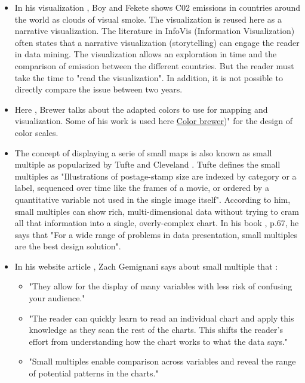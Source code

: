 \documentclass[preprint,journal]{vgtc}       %
\begin{document}
\begin{itemize}[leftmargin=*,parsep=0cm]
\item In his visualization \cite{Boy:2014:TCP}, Boy and Fekete shows C02 emissions in countries around the world as clouds of visual smoke. The visualization is reused here \cite{Mediapart:2014:CPM} as a narrative visualization. The literature in InfoVis (Information Visualization) often states that a narrative visualization (storytelling) can engage the reader in data mining. The visualization allows an exploration in time and the comparison of emission between the different countries. But the reader must take the time to "read the visualization". In addition, it is not possible to directly compare the issue between two years.

\item Here \cite{Brewer:1994:CUG} , Brewer talks about the adapted colors to use for mapping and visualization. Some of his work is used here \href{http://colorbrewer2.org/#type=sequential&scheme=YlGnBu&n=3}{Color brewer})" for the design of color scales.

\item The concept of displaying a serie of small maps is also known as small multiple as popularized by Tufte \cite{Tufte:1983:VDQ} and Cleveland \cite{Cleveland:1985:TEG}. Tufte defines the small multiples as "Illustrations of postage-stamp size are indexed by category or a label, sequenced over time like the frames of a movie, or ordered by a quantitative variable not used in the single image itself". According to him, small multiples can show rich, multi-dimensional data without trying to cram all that information into a single, overly-complex chart. In his book \cite{Tufte:1990:ENI}, p.67, he says that "For a wide range of problems in data presentation, small multiples are the best design solution". 


\item In his website article \cite{Gemignani:2010:BKV}, Zach Gemignani says about small multiple that :
	\begin{itemize}
		\item "They allow for the display of many variables with less risk of confusing your audience."
		\item "The reader can quickly learn to read an individual chart and apply this knowledge as they scan the rest of the charts. This shifts the reader’s effort from understanding how the chart works to what the data says."
		\item "Small multiples enable comparison across variables and reveal the range of potential patterns in the charts."
	\end{itemize}


\end{itemize}
\end{document}
